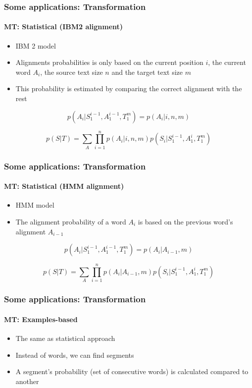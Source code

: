 \documentclass[xcolor=table]{beamer}
\begin{document}
\begin{frame}
	\frametitle{Some applications: Transformation}
	\framesubtitle{MT: Statistical (IBM2 alignment)}
	\begin{itemize}
		\item IBM 2 model
		\item Alignments probabilities is only based on the current position $i$, the current word $A_i$, the source text size $n$ and the target text size $m$
		\item This probability is estimated by comparing the correct alignment  with the rest
	\end{itemize}
	
	\[p(A_i | S_1^{i-1}, A_1^{i-1}, T_1^{m}) = p(A_i | i, n, m)\]
	
	\[p(S|T) = \sum_{A} \prod_{i=1}^{n} p(A_i | i, n, m) p(S_i | S_1^{i-1}, A_1^{i}, T_1^{m})\]
\end{frame}

\begin{frame}
	\frametitle{Some applications: Transformation}
	\framesubtitle{MT: Statistical (HMM alignment)}
	\begin{itemize}
		\item HMM model
		\item The alignment probability of a word $A_i$ is based on the previous word's alignment $A_{i-1}$
	\end{itemize}
	
	\[p(A_i | S_1^{i-1}, A_1^{i-1}, T_1^{m}) = p(A_i | A_{i-1}, m)\]
	
	\[p(S|T) = \sum_{A} \prod_{i=1}^{n} p(A_i | A_{i-1}, m) p(S_i | S_1^{i-1}, A_1^{i}, T_1^{m})\]
\end{frame}

\begin{frame}
	\frametitle{Some applications: Transformation}
	\framesubtitle{MT: Examples-based}
	\begin{itemize}
		\item The same as statistical approach
		\item Instead of words, we can find segments
		\item A segment's probability (set of consecutive words) is calculated compared to another
	\end{itemize}
\end{frame}
\end{document}
